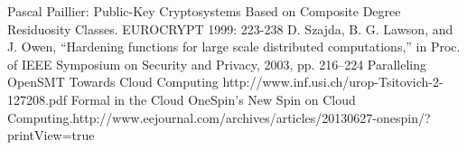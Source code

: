 \documentclass[runningheads,a4paper]{llncs}
\begin{document}
\newline[31]	Pascal Paillier: Public-Key Cryptosystems Based on Composite Degree Residuosity Classes. EUROCRYPT 1999: 223-238
\newline[33]	D. Szajda, B. G. Lawson, and J. Owen, “Hardening functions for large scale distributed computations,” in Proc. of IEEE Symposium on Security and Privacy, 2003, pp. 216–224
\newline[35]	Paralleling OpenSMT Towards Cloud Computing http://www.inf.usi.ch/urop-Tsitovich-2-127208.pdf‎
\newline[37]	Formal in the Cloud OneSpin’s New Spin on Cloud Computing.http://www.eejournal.com/archives/articles/20130627-onespin/?printView=true
\end{document}
